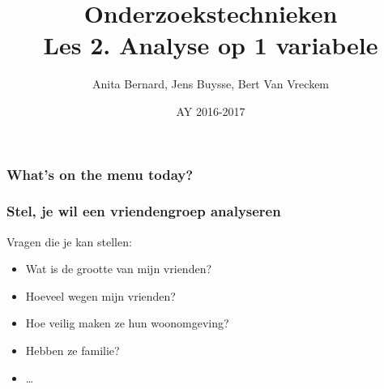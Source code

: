 \documentclass{beamer}
\title[Intro]{Onderzoekstechnieken\\Les 2. Analyse op 1 variabele}
\author{Anita Bernard, Jens Buysse, Bert {Van Vreckem}}
\date{AY 2016-2017}
\begin{document}

\HoGentLogo

\titleframe


\begin{frame}
  \frametitle{What's on the menu today?}

  \tableofcontents
\end{frame}

\begin{frame}
  \frametitle{Stel, je wil een vriendengroep analyseren}

  Vragen die je kan stellen:

  \begin{itemize}
    \item Wat is de grootte van mijn vrienden?
    \item Hoeveel wegen mijn vrienden?
    \item Hoe veilig maken ze hun woonomgeving?
    \item Hebben ze familie?
    \item \ldots
  \end{itemize}
\end{frame}
\end{document}
